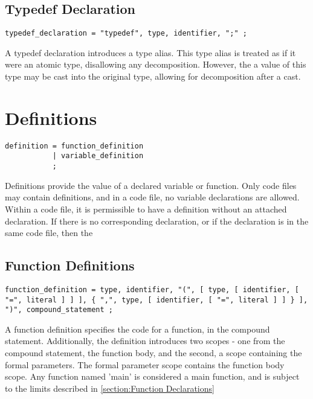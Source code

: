 \documentclass[letterpaper,12pt]{book}
\begin{document}
\section{Typedef Declaration}

\begin{lstlisting}[breaklines=true]
typedef_declaration = "typedef", type, identifier, ";" ;
\end{lstlisting}

A typedef declaration introduces a type alias. This type alias is treated as if it were an atomic type, disallowing any decomposition. However, the a value of this type may be cast into the original type, allowing for decomposition after a cast.

\chapter{Definitions}

\begin{lstlisting}[breaklines=true]
definition = function_definition
           | variable_definition
           ;
\end{lstlisting}

Definitions provide the value of a declared variable or function. Only code files may contain definitions, and in a code file, no variable declarations are allowed. Within a code file, it is permissible to have a definition without an attached declaration. If there is no corresponding declaration, or if the declaration is in the same code file, then the 

\section{Function Definitions}

\begin{lstlisting}[breaklines=true]
function_definition = type, identifier, "(", [ type, [ identifier, [ "=", literal ] ] ], { ",", type, [ identifier, [ "=", literal ] ] } ], ")", compound_statement ;
\end{lstlisting}

A function definition specifies the code for a function, in the compound statement. Additionally, the definition introduces two scopes - one from the compound statement, the function body, and the second, a scope containing the formal parameters. The formal parameter scope contains the function body scope. Any function named 'main' is considered a main function, and is subject to the limits described in \ref{section:Function Declarations}
\end{document}
